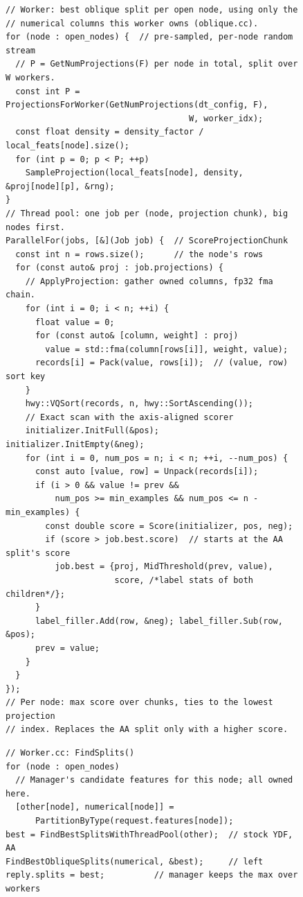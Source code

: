 \begin{figure}[t]
\begin{minipage}[t]{0.52\textwidth}
\begin{lstlisting}
// Worker: best oblique split per open node, using only the
// numerical columns this worker owns (oblique.cc).
for (node : open_nodes) {  // pre-sampled, per-node random stream
  // P = GetNumProjections(F) per node in total, split over W workers.
  const int P = ProjectionsForWorker(GetNumProjections(dt_config, F),
                                     W, worker_idx);
  const float density = density_factor / local_feats[node].size();
  for (int p = 0; p < P; ++p)
    SampleProjection(local_feats[node], density, &proj[node][p], &rng);
}
// Thread pool: one job per (node, projection chunk), big nodes first.
ParallelFor(jobs, [&](Job job) {  // ScoreProjectionChunk
  const int n = rows.size();      // the node's rows
  for (const auto& proj : job.projections) {
    // ApplyProjection: gather owned columns, fp32 fma chain.
    for (int i = 0; i < n; ++i) {
      float value = 0;
      for (const auto& [column, weight] : proj)
        value = std::fma(column[rows[i]], weight, value);
      records[i] = Pack(value, rows[i]);  // (value, row) sort key
    }
    hwy::VQSort(records, n, hwy::SortAscending());
    // Exact scan with the axis-aligned scorer
    initializer.InitFull(&pos); initializer.InitEmpty(&neg);
    for (int i = 0, num_pos = n; i < n; ++i, --num_pos) {
      const auto [value, row] = Unpack(records[i]);
      if (i > 0 && value != prev &&
          num_pos >= min_examples && num_pos <= n - min_examples) {
        const double score = Score(initializer, pos, neg);
        if (score > job.best.score)  // starts at the AA split's score
          job.best = {proj, MidThreshold(prev, value),
                      score, /*label stats of both children*/};
      }
      label_filler.Add(row, &neg); label_filler.Sub(row, &pos);
      prev = value;
    }
  }
});
// Per node: max score over chunks, ties to the lowest projection
// index. Replaces the AA split only with a higher score.
\end{lstlisting}
\end{minipage}\hfill
\begin{minipage}[t]{0.46\textwidth}
\begin{lstlisting}
// Worker.cc: FindSplits()
for (node : open_nodes)
  // Manager's candidate features for this node; all owned here.
  [other[node], numerical[node]] =
      PartitionByType(request.features[node]);
best = FindBestSplitsWithThreadPool(other);  // stock YDF, AA
FindBestObliqueSplits(numerical, &best);     // left
reply.splits = best;          // manager keeps the max over workers


\end{lstlisting}
\end{minipage}
\end{figure}
